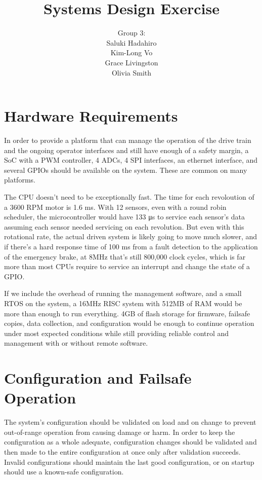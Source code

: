 \documentclass{article}
\title{Systems Design Exercise}
\author{Group 3: \\
  Saluki Hadahiro \\
  Kim-Long Vo \\
  Grace Livingston \\
  Olivia Smith \\}
\begin{document}
\maketitle
\tableofcontents

\section{Hardware Requirements}

In order to provide a platform that can manage the operation of the
drive train and the ongoing operator interfaces and still have enough
of a safety margin, a SoC with a PWM controller, 4 ADCs, 4 SPI
interfaces, an ethernet interface, and several GPIOs should be
available on the system. These are common on many platforms.

The CPU doesn’t need to be exceptionally fast. The time for each
revoloution of a 3600 RPM motor is 1.6 ms. With 12 sensors, even with
a round robin scheduler, the microcontroller would have 133 μs to
service each sensor’s data assuming each sensor needed servicing on
each revolution. But even with this rotational rate, the actual driven
system is likely going to move much slower, and if there’s a hard
response time of 100 ms from a fault detection to the application of
the emergency brake, at 8MHz that’s still 800,000 clock cycles, which
is far more than most CPUs require to service an interrupt and change
the state of a GPIO.

If we include the overhead of running the management software, and
a small RTOS on the system, a 16MHz RISC system with 512MB of RAM
would be more than enough to run everything. 4GB of flash storage for
firmware, failsafe copies, data collection, and configuration would be
enough to continue operation under most expected conditions while
still providing reliable control and management with or without
remote software.

\section{Configuration and Failsafe Operation}

The system’s configuration should be validated on load and on change
to prevent out-of-range operation from causing damage or harm.
In order to keep the configuration as a whole adequate, configuration
changes should be validated and then made to the entire configuration
at once only after validation succeeds. Invalid configurations should
maintain the last good configuration, or on startup should use
a known-safe configuration.
\end{document}
